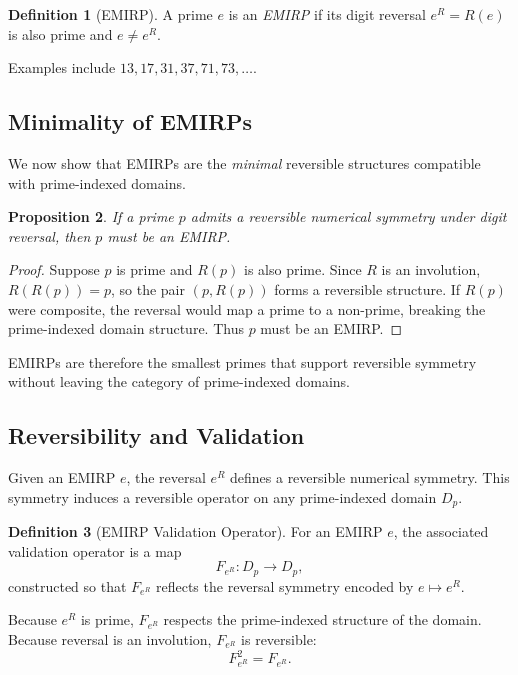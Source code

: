 \documentclass[11pt]{article}
\theoremstyle{definition}
\newtheorem{definition}{Definition}[section]
\theoremstyle{plain}
\newtheorem{proposition}[definition]{Proposition}
\theoremstyle{remark}
\begin{document}
\begin{definition}[EMIRP]
A prime $e$ is an \emph{EMIRP} if its digit reversal $e^R = R(e)$ is
also prime and $e \neq e^R$.
\end{definition}

Examples include $13,17,31,37,71,73,\dots$.

\subsection{Minimality of EMIRPs}

We now show that EMIRPs are the \emph{minimal} reversible structures
compatible with prime-indexed domains.

\begin{proposition}
If a prime $p$ admits a reversible numerical symmetry under digit
reversal, then $p$ must be an EMIRP.
\end{proposition}

\begin{proof}
Suppose $p$ is prime and $R(p)$ is also prime. Since $R$ is an
involution, $R(R(p))=p$, so the pair $(p, R(p))$ forms a reversible
structure. If $R(p)$ were composite, the reversal would map a prime to a
non-prime, breaking the prime-indexed domain structure. Thus $p$ must be
an EMIRP.
\end{proof}

EMIRPs are therefore the smallest primes that support reversible
symmetry without leaving the category of prime-indexed domains.

\subsection{Reversibility and Validation}

Given an EMIRP $e$, the reversal $e^R$ defines a reversible numerical
symmetry. This symmetry induces a reversible operator on any
prime-indexed domain $D_p$.

\begin{definition}[EMIRP Validation Operator]
For an EMIRP $e$, the associated validation operator is a map
\[
F_{e^R} : D_p \to D_p,
\]
constructed so that $F_{e^R}$ reflects the reversal symmetry encoded by
$e \mapsto e^R$.
\end{definition}

Because $e^R$ is prime, $F_{e^R}$ respects the prime-indexed structure
of the domain. Because reversal is an involution, $F_{e^R}$ is
reversible:
\[
F_{e^R}^2 = F_{e^R}.
\]
\end{document}
